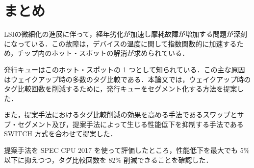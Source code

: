 
\chapter{まとめ}
\label{sec:summary}
LSIの微細化の進展に伴って，経年劣化が加速し摩耗故障が増加する問題が深刻になっている．この故障は，デバイスの温度に関して指数関数的に加速するため，チップ内のホット・スポットの解消が求められている．

発行キューはこのホット・スポットの 1 つとして知られている．この主な原因はウェイクアップ時の多数のタグ比較である．本論文では，ウェイクアップ時のタグ比較回数を削減するために，発行キューをセグメント化する方法を提案した．

また，提案手法におけるタグ比較削減の効果を高める手法であるスワップとサブ・セグメント及び，提案手法によって生じる性能低下を抑制する手法である SWITCH 方式を合わせて提案した．

提案手法を SPEC CPU 2017 を使って評価したところ，性能低下を最大でも 5\% 以下に抑えつつ，タグ比較回数を 82\% 削減できることを確認した．
